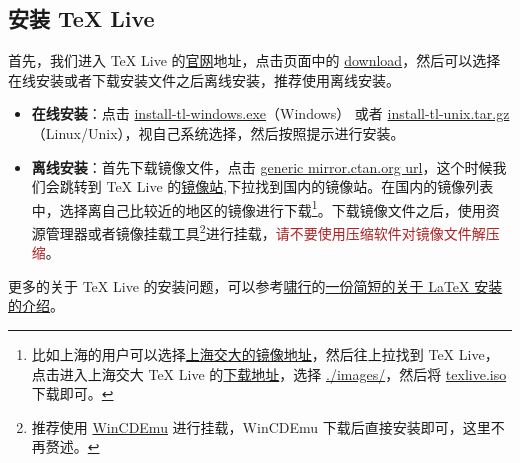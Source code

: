 \documentclass[11pt,a4paper]{dlove}
\begin{document}
\subsection{安装 \TeX{} Live}
首先，我们进入 \TeX{} Live 的\href{https://www.tug.org/texlive/}{官网}地址，点击页面中的 \href{https://www.tug.org/texlive/acquire-netinstall.html}{download}，然后可以选择在线安装或者下载安装文件之后离线安装，推荐使用离线安装。
\begin{itemize}
  \item \textbf{在线安装}：点击 \href{http://mirror.ctan.org/systems/texlive/tlnet/install-tl-windows.exe}{install-tl-windows.exe}（Windows） 或者 \href{http://mirror.ctan.org/systems/texlive/tlnet/install-tl-unx.tar.gz}{install-tl-unix.tar.gz}（Linux/Unix），视自己系统选择，然后按照提示进行安装。
  \item \textbf{离线安装}：首先下载镜像文件，点击 \href{https://ctan.org/mirrors}{generic mirror.ctan.org url}，这个时候我们会跳转到 \TeX{} Live 的\href{https://ctan.org/mirrors}{镜像站},下拉找到国内的镜像站。在国内的镜像列表中，选择离自己比较近的地区的镜像进行下载\footnote{比如上海的用户可以选择\href{https://mirrors.sjtug.sjtu.edu.cn/ctan/}{上海交大的镜像地址}，然后往上拉找到 \TeX{} Live，点击进入上海交大 \TeX{} Live 的\href{https://mirrors.sjtug.sjtu.edu.cn/ctan/systems/texlive/}{下载地址}，选择 \href{https://mirrors.sjtug.sjtu.edu.cn/ctan/systems/texlive/Images/}{./images/}，然后将 \href{https://mirrors.sjtug.sjtu.edu.cn/ctan/systems/texlive/Images/texlive.iso}{texlive.iso}下载即可。}。下载镜像文件之后，使用资源管理器或者镜像挂载工具\footnote{推荐使用 \href{http://wincdemu.sysprogs.org/}{WinCDEmu} 进行挂载，WinCDEmu 下载后直接安装即可，这里不再赘述。}进行挂载，\textsf{\textcolor{FireBrick}{请不要使用压缩软件对镜像文件解压缩}}。
\end{itemize}

更多的关于 \TeX{} Live 的安装问题，可以参考\href{https://github.com/OsbertWang}{啸行}的\href{https://github.com/OsbertWang/install-latex}{一份简短的关于 \LaTeX{} 安装的介绍}。
\end{document}
